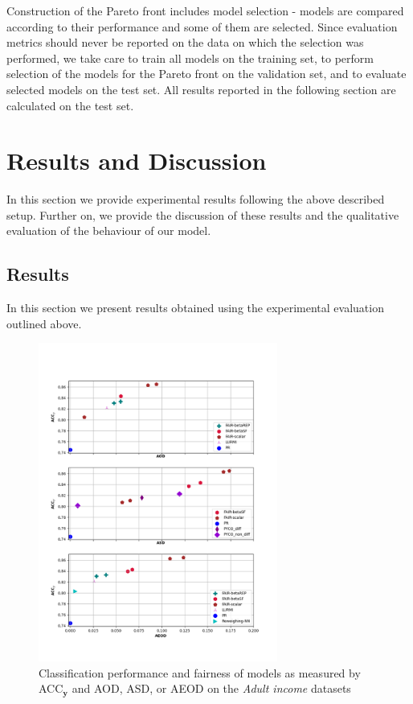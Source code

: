 \documentclass[preprint,12pt]{elsarticle}
\begin{document}
Construction of the Pareto front includes model selection - models are compared according to their performance and some of them are selected. Since evaluation metrics should never be reported on the data on which the selection was performed, we take care to train all models on the training set, to perform selection of the models for the Pareto front on the validation set, and to evaluate selected models on the test set. All results reported in the following section are calculated on the test set.

\section{Results and Discussion}
\label{sec:ResultsDiscussion}

In this section we provide experimental results following the above described setup. Further on, we provide the discussion of these results and the qualitative evaluation of the behaviour of our model.

\subsection{Results}
\label{sec:Results}

In this section we present results obtained using the experimental evaluation outlined above.

\begin{figure}
	\center
	\includegraphics[angle=0, width=0.7\textwidth]{Adult_ACC.png}
	\captionsetup{justification=centering}
	\caption{Classification performance and fairness of models as measured by ACC$_\mathbf{y}$ and AOD, ASD, or AEOD on the \textit{Adult income} datasets}
	\label{fig:Adult}
	\vskip -0.2in
\end{figure}
\end{document}
